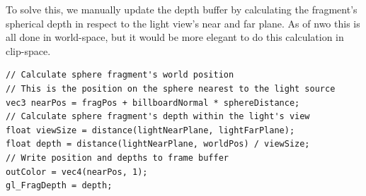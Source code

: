 To solve this, we manually update the depth buffer by calculating the fragment's spherical depth in respect to the light view's near and far plane. As of nwo this is all done in world-space, but it would be more elegant to do this calculation in clip-space.
\begin{lstlisting}[caption={first\_voxelize.glsl, 60}]
// Calculate sphere fragment's world position 
// This is the position on the sphere nearest to the light source
vec3 nearPos = fragPos + billboardNormal * sphereDistance;
// Calculate sphere fragment's depth within the light's view
float viewSize = distance(lightNearPlane, lightFarPlane);
float depth = distance(lightNearPlane, worldPos) / viewSize;
// Write position and depths to frame buffer
outColor = vec4(nearPos, 1);
gl_FragDepth = depth;
\end{lstlisting}

